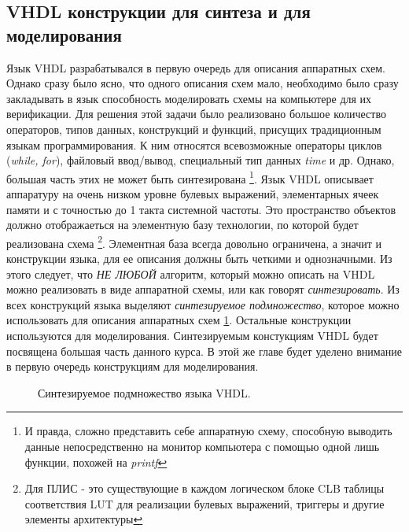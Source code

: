 \subsection{VHDL конструкции для синтеза и для моделирования}


Язык VHDL разрабатывался в первую очередь для описания аппаратных схем. Однако сразу было ясно, что одного описания схем мало, необходимо было сразу закладывать в язык способность моделировать схемы на компьютере для их верификации. Для решения этой задачи было реализовано большое количество операторов, типов данных, конструкций и функций, присущих традиционным языкам программирования. К ним относятся всевозможные операторы циклов (\emph{while, for}), файловый ввод/вывод, специальный тип данных \emph{time} и др. Однако, большая часть этих не может быть синтезирована \footnote{И правда, сложно представить себе аппаратную схему, способную выводить данные непосредственно на монитор компьютера с помощью одной лишь функции, похожей на \emph{printf}}. Язык VHDL описывает аппаратуру на очень низком уровне булевых выражений, элементарных ячеек памяти и с точностью до 1 такта системной частоты. Это пространство объектов должно отображаеться на элементную базу технологии, по которой будет реализована схема \footnote{Для ПЛИС - это существующие в каждом логическом блоке CLB таблицы соответствия LUT для реализации булевых выражений, триггеры и другие элементы архитектуры}. Элементная база всегда довольно ограничена, а значит и конструкции языка, для ее описания должны быть четкими и однозначными. Из этого следует, что \emph{НЕ ЛЮБОЙ} алгоритм, который можно описать на VHDL можно реализовать в виде аппаратной схемы, или как говорят \emph{синтезировать}. Из всех конструкций языка выделяют \emph{синтезируемое подмножество}, которое можно использовать для описания аппаратных схем \ref{vhdl_set_1}. Остальные конструкции используются для моделирования. Синтезируемым констукциям VHDL будет посвящена большая часть данного курса. В этой же главе будет уделено внимание в первую очередь конструкциям для моделирования.

\begin{figure}[ht]
\centering
{}
\caption{Синтезируемое подмножество языка VHDL.}
\label{vhdl_set_1}
\end{figure}

